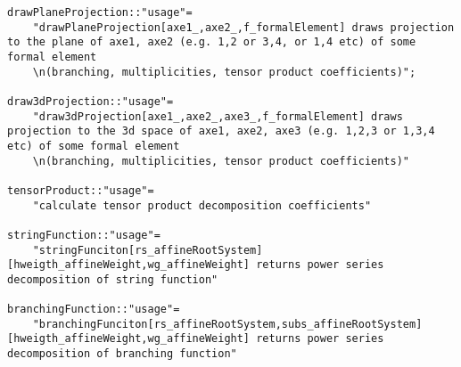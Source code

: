 \documentclass[preprint,12pt]{article}
\begin{document}
\begin{lstlisting}
drawPlaneProjection::"usage"=
    "drawPlaneProjection[axe1_,axe2_,f_formalElement] draws projection to the plane of axe1, axe2 (e.g. 1,2 or 3,4, or 1,4 etc) of some formal element
    \n(branching, multiplicities, tensor product coefficients)";

draw3dProjection::"usage"=
    "draw3dProjection[axe1_,axe2_,axe3_,f_formalElement] draws projection to the 3d space of axe1, axe2, axe3 (e.g. 1,2,3 or 1,3,4 etc) of some formal element
    \n(branching, multiplicities, tensor product coefficients)"

tensorProduct::"usage"=
    "calculate tensor product decomposition coefficients"

stringFunction::"usage"=
    "stringFunciton[rs_affineRootSystem][hweigth_affineWeight,wg_affineWeight] returns power series decomposition of string function"

branchingFunction::"usage"=
    "branchingFunciton[rs_affineRootSystem,subs_affineRootSystem][hweigth_affineWeight,wg_affineWeight] returns power series decomposition of branching function"

\end{lstlisting}

  
\end{document}
